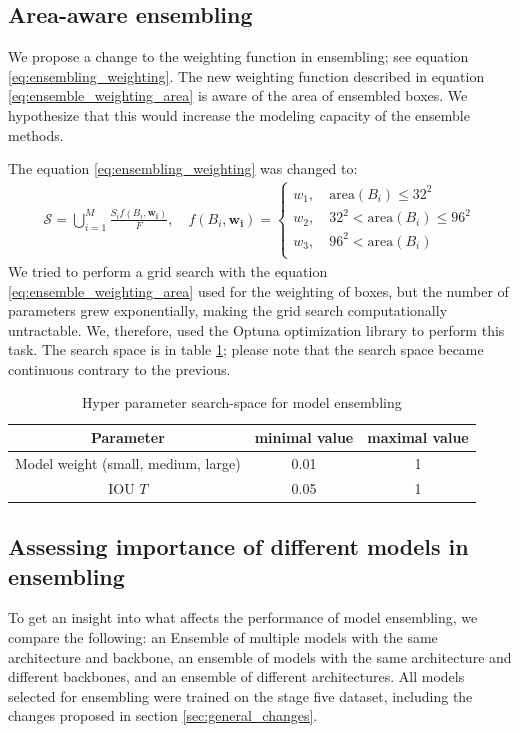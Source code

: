 \subsection{Area-aware ensembling}
We propose a change to the weighting function in ensembling; see equation \ref{eq:ensembling_weighting}. The new weighting function described in equation \ref{eq:ensemble_weighting_area} is aware of the area of ensembled boxes. We hypothesize that this would increase the modeling capacity of the ensemble methods.

The equation \ref{eq:ensembling_weighting} was changed to:
\begin{align}
    \mathcal{S} = \bigcup_{i=1}^{M} \frac{S_i f(B_i, \mathbf{w_i})}{ F}, \quad
    f(B_i, \mathbf{w_i}) = \begin{cases}
        w_1,\quad \text{area}(B_i) \leq 32^2        \\
        w_2,\quad 32^2 < \text{area}(B_i) \leq 96^2 \\
        w_3,\quad 96^2 < \text{area}(B_i)           \\
    \end{cases}
    \label{eq:ensemble_weighting_area}
\end{align}
We tried to perform a grid search with the equation \ref{eq:ensemble_weighting_area} used for the weighting of boxes, but the number of parameters grew exponentially, making the grid search computationally untractable. We, therefore, used the Optuna optimization library to perform this task. The search space is in table \ref{tab:ensembling_search_space_area}; please note that the search space became continuous contrary to the previous.

\begin{table}
    \centering
    \begin{tabular}{|c|c|c|}
        \hline
        Parameter                           & minimal value & maximal value \\ \hline
        Model weight (small, medium, large) & 0.01          & 1             \\ \hline
        IOU $T$                             & 0.05          & 1             \\ \hline
    \end{tabular}
    \caption{Hyper parameter search-space for model ensembling}
    \label{tab:ensembling_search_space_area}
\end{table}


\subsection{Assessing importance of different models in ensembling}
To get an insight into what affects the performance of model ensembling, we compare the following: an Ensemble of multiple models with the same architecture and backbone, an ensemble of models with the same architecture and different backbones, and an ensemble of different architectures. All models selected for ensembling were trained on the stage five dataset, including the changes proposed in section \ref{sec:general_changes}.

